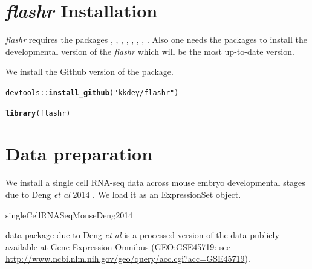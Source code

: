 \documentclass[12pt]{article}\usepackage[]{graphicx}\usepackage[usenames,dvipsnames]{color}
\makeatletter
\newcommand{\hlstr}[1]{\textcolor[rgb]{0.192,0.494,0.8}{#1}}%
\newcommand{\hlopt}[1]{\textcolor[rgb]{0,0,0}{#1}}%
\newcommand{\hlstd}[1]{\textcolor[rgb]{0.345,0.345,0.345}{#1}}%
\newcommand{\hlkwd}[1]{\textcolor[rgb]{0.737,0.353,0.396}{\textbf{#1}}}%
\newenvironment{kframe}{%
 \def\at@end@of@kframe{}%
 \ifinner\ifhmode%
  \def\at@end@of@kframe{\end{minipage}}%
  \begin{minipage}{\columnwidth}%
 \fi\fi%
 \def\FrameCommand##1{\hskip\@totalleftmargin \hskip-\fboxsep
 \colorbox{shadecolor}{##1}\hskip-\fboxsep
     \hskip-\linewidth \hskip-\@totalleftmargin \hskip\columnwidth}%
 \MakeFramed {\advance\hsize-\width
   \@totalleftmargin\z@ \linewidth\hsize
   \@setminipage}}%
 {\par\unskip\endMakeFramed%
 \at@end@of@kframe}
\newenvironment{knitrout}{}{} %
\newcommand{\flashr}{\textit{flashr}}
\makeatother
\begin{document}
\section{\flashr{} Installation}

\flashr{} requires the packages , , , , , , , . Also one needs the packages to install the developmental version of the \flashr{} which will be the most up-to-date version.

We install the Github version of the package.

\begin{knitrout}
\color{fgcolor}\begin{kframe}
\begin{alltt}
\hlstd{devtools}\hlopt{::}\hlkwd{install_github}\hlstd{(}\hlstr{"kkdey/flashr"}\hlstd{)}
\end{alltt}
\end{kframe}
\end{knitrout}

\begin{knitrout}
\color{fgcolor}\begin{kframe}
\begin{alltt}
\hlkwd{library}\hlstd{(flashr)}
\end{alltt}
\end{kframe}
\end{knitrout}

\section{Data preparation}

We install a single cell RNA-seq data across mouse embryo developmental stages due to Deng \textit{et al} 2014 \cite{Deng2014}. We load it as an ExpressionSet object.\begin{verb} singleCellRNASeqMouseDeng2014 \end{verb} data package due to Deng \textit{et al} is a processed version of the data publicly available at Gene Expression Omnibus (GEO:GSE45719: see \url{http://www.ncbi.nlm.nih.gov/geo/query/acc.cgi?acc=GSE45719}).
\end{document}
